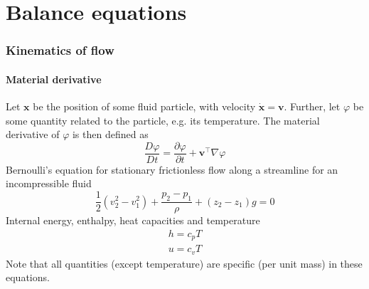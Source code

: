 \part{Balance equations}
\section{Kinematics of flow}
\subsection{Material derivative}
Let $\mathbf{x}$ be the position of some fluid particle, with velocity $\dot{\mathbf{x}} = \mathbf{v}$. Further, let $\varphi$ be some quantity related to the particle, e.g. its temperature. The material derivative of $\varphi$ is then defined as
\begin{equation}
    \frac{D\varphi}{Dt} = \frac{\partial \varphi}{\partial t} + \mathbf{v}^\top \nabla \varphi
\end{equation}
Bernoulli's equation for stationary frictionless flow along a streamline for an incompressible fluid
\begin{equation}
    \frac{1}{2} (v_2^2 - v_1^2) + \frac{p_2 - p_1}{\rho} + (z_2 - z_1)g = 0
\end{equation}
Internal energy, enthalpy, heat capacities and temperature
\begin{align}
    h = c_p T\\
    u = c_v T
\end{align}
Note that all quantities (except temperature) are specific (per unit mass) in these equations. 